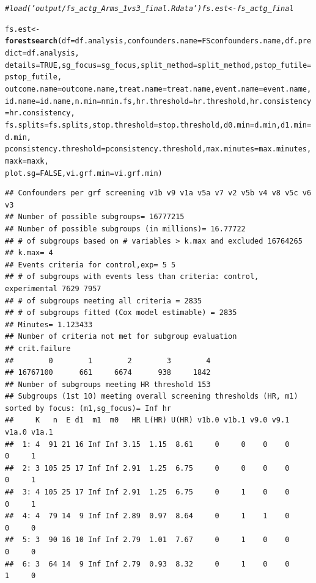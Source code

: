 \documentclass[9pt]{article}\usepackage[]{graphicx}\usepackage[]{xcolor}
\makeatletter
\newcommand{\hlnum}[1]{\textcolor[rgb]{0.686,0.059,0.569}{#1}}%
\newcommand{\hlcom}[1]{\textcolor[rgb]{0.678,0.584,0.686}{\textit{#1}}}%
\newcommand{\hlstd}[1]{\textcolor[rgb]{0.345,0.345,0.345}{#1}}%
\newcommand{\hlkwb}[1]{\textcolor[rgb]{0.69,0.353,0.396}{#1}}%
\newcommand{\hlkwc}[1]{\textcolor[rgb]{0.333,0.667,0.333}{#1}}%
\newcommand{\hlkwd}[1]{\textcolor[rgb]{0.737,0.353,0.396}{\textbf{#1}}}%
\newenvironment{kframe}{%
 \def\at@end@of@kframe{}%
 \ifinner\ifhmode%
  \def\at@end@of@kframe{\end{minipage}}%
  \begin{minipage}{\columnwidth}%
 \fi\fi%
 \def\FrameCommand##1{\hskip\@totalleftmargin \hskip-\fboxsep
 \colorbox{shadecolor}{##1}\hskip-\fboxsep
     \hskip-\linewidth \hskip-\@totalleftmargin \hskip\columnwidth}%
 \MakeFramed {\advance\hsize-\width
   \@totalleftmargin\z@ \linewidth\hsize
   \@setminipage}}%
 {\par\unskip\endMakeFramed%
 \at@end@of@kframe}
\newenvironment{knitrout}{}{} %
\theoremstyle{definition}
\theoremstyle{remark}
\makeatother
\begin{document}
\begin{knitrout}
\begin{kframe}
\begin{alltt}
\hlcom{# load('output/fs_actg_Arms_1vs3_final.Rdata') fs.est<-fs_actg_final}

\hlstd{fs.est} \hlkwb{<-} \hlkwd{forestsearch}\hlstd{(}\hlkwc{df} \hlstd{= df.analysis,} \hlkwc{confounders.name} \hlstd{= FSconfounders.name,} \hlkwc{df.predict} \hlstd{= df.analysis,}
    \hlkwc{details} \hlstd{=} \hlnum{TRUE}\hlstd{,} \hlkwc{sg_focus} \hlstd{= sg_focus,} \hlkwc{split_method} \hlstd{= split_method,} \hlkwc{pstop_futile} \hlstd{= pstop_futile,}
    \hlkwc{outcome.name} \hlstd{= outcome.name,} \hlkwc{treat.name} \hlstd{= treat.name,} \hlkwc{event.name} \hlstd{= event.name,}
    \hlkwc{id.name} \hlstd{= id.name,} \hlkwc{n.min} \hlstd{= nmin.fs,} \hlkwc{hr.threshold} \hlstd{= hr.threshold,} \hlkwc{hr.consistency} \hlstd{= hr.consistency,}
    \hlkwc{fs.splits} \hlstd{= fs.splits,} \hlkwc{stop.threshold} \hlstd{= stop.threshold,} \hlkwc{d0.min} \hlstd{= d.min,} \hlkwc{d1.min} \hlstd{= d.min,}
    \hlkwc{pconsistency.threshold} \hlstd{= pconsistency.threshold,} \hlkwc{max.minutes} \hlstd{= max.minutes,} \hlkwc{maxk} \hlstd{= maxk,}
    \hlkwc{plot.sg} \hlstd{=} \hlnum{FALSE}\hlstd{,} \hlkwc{vi.grf.min} \hlstd{= vi.grf.min)}
\end{alltt}
\begin{verbatim}
## Confounders per grf screening v1b v9 v1a v5a v7 v2 v5b v4 v8 v5c v6 v3 
## Number of possible subgroups= 16777215 
## Number of possible subgroups (in millions)= 16.77722 
## # of subgroups based on # variables > k.max and excluded 16764265 
## k.max= 4 
## Events criteria for control,exp= 5 5 
## # of subgroups with events less than criteria: control, experimental 7629 7957 
## # of subgroups meeting all criteria = 2835 
## # of subgroups fitted (Cox model estimable) = 2835 
## Minutes= 1.123433 
## Number of criteria not met for subgroup evaluation 
## crit.failure
##        0        1        2        3        4 
## 16767100      661     6674      938     1842 
## Number of subgroups meeting HR threshold 153 
## Subgroups (1st 10) meeting overall screening thresholds (HR, m1) sorted by focus: (m1,sg_focus)= Inf hr 
##     K   n  E d1  m1  m0   HR L(HR) U(HR) v1b.0 v1b.1 v9.0 v9.1 v1a.0 v1a.1
##  1: 4  91 21 16 Inf Inf 3.15  1.15  8.61     0     0    0    0     0     1
##  2: 3 105 25 17 Inf Inf 2.91  1.25  6.75     0     0    0    0     0     1
##  3: 4 105 25 17 Inf Inf 2.91  1.25  6.75     0     1    0    0     0     1
##  4: 4  79 14  9 Inf Inf 2.89  0.97  8.64     0     1    1    0     0     0
##  5: 3  90 16 10 Inf Inf 2.79  1.01  7.67     0     1    0    0     0     0
##  6: 3  64 14  9 Inf Inf 2.79  0.93  8.32     0     1    0    0     1     0

\end{verbatim}
\end{kframe}
\end{knitrout}
\end{document}
